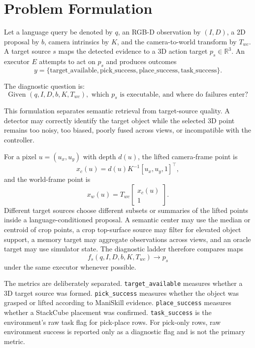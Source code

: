 \documentclass[preprint,12pt]{elsarticle}
\begin{document}
\section{Problem Formulation}

Let a language query be denoted by $q$, an RGB-D observation by $(I, D)$, a 2D
proposal by $b$, camera intrinsics by $K$, and the camera-to-world transform by
$T_{wc}$. A target source $s$ maps the detected evidence to a 3D action target
$p_s \in \mathbb{R}^3$. An executor $E$ attempts to act on $p_s$ and produces
outcomes
\[
  y = \{\text{target\_available}, \text{pick\_success},
  \text{place\_success}, \text{task\_success}\}.
\]

The diagnostic question is:
\[
  \text{Given } (q, I, D, b, K, T_{wc}), \text{ which } p_s
  \text{ is executable, and where do failures enter?}
\]

This formulation separates semantic retrieval from target-source quality. A
detector may correctly identify the target object while the selected 3D point
remains too noisy, too biased, poorly fused across views, or incompatible with
the controller.

For a pixel $u=(u_x,u_y)$ with depth $d(u)$, the lifted camera-frame point is
\[
  x_c(u) = d(u)K^{-1}[u_x, u_y, 1]^\top ,
\]
and the world-frame point is
\[
  x_w(u) = T_{wc} \begin{bmatrix} x_c(u) \\ 1 \end{bmatrix}.
\]
Different target sources choose different subsets or summaries of the lifted
points inside a language-conditioned proposal. A semantic center may use the
median or centroid of crop points, a crop top-surface source may filter for
elevated object support, a memory target may aggregate observations across
views, and an oracle target may use simulator state. The diagnostic ladder
therefore compares maps
\[
  f_s(q, I, D, b, K, T_{wc}) \rightarrow p_s
\]
under the same executor whenever possible.

The metrics are deliberately separated. \texttt{target\_available} measures
whether a 3D target source was formed. \texttt{pick\_success} measures whether
the object was grasped or lifted according to ManiSkill evidence.
\texttt{place\_success} measures whether a StackCube placement was confirmed.
\texttt{task\_success} is the environment's raw task flag for pick-place rows.
For pick-only rows, raw environment success is reported only as a diagnostic
flag and is not the primary metric.
\end{document}

